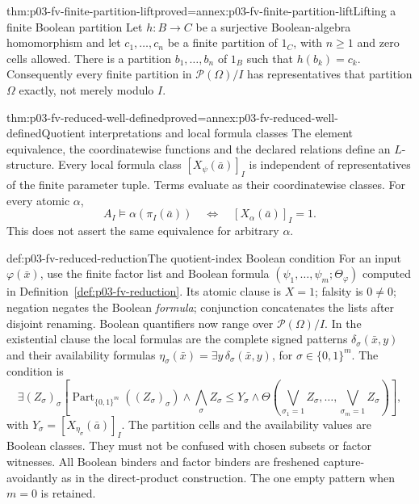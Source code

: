 \begin{hblemma}{thm:p03-fv-finite-partition-lift}{proved=annex:p03-fv-finite-partition-lift}{Lifting a finite Boolean partition}
Let \(h:B\to C\) be a surjective Boolean-algebra homomorphism and
let \(c_1,\ldots,c_n\) be a finite partition of \(1_C\), with
\(n\ge1\) and zero cells allowed. There is a partition
\(b_1,\ldots,b_n\) of \(1_B\) such that \(h(b_k)=c_k\).
Consequently every finite partition in \(\mathcal P(\Omega)/I\)
has representatives that partition \(\Omega\) exactly, not merely
modulo \(I\).
\end{hblemma}

\begin{hblemma}{thm:p03-fv-reduced-well-defined}{proved=annex:p03-fv-reduced-well-defined}{Quotient interpretations and local formula classes}
The element equivalence, the coordinatewise functions and the declared
relations define an \(L\)-structure. Every local formula class
\([X_\psi(\bar a)]_I\) is independent of representatives of the
finite parameter tuple. Terms evaluate as their coordinatewise classes.
For every atomic \(\alpha\),
\[
 A_I\models\alpha(\pi_I(\bar a))
 \quad\Longleftrightarrow\quad
 [X_\alpha(\bar a)]_I=1.
\]
This does not assert the same equivalence for arbitrary \(\alpha\).
\end{hblemma}

\begin{hbdefinition}{def:p03-fv-reduced-reduction}{The quotient-index Boolean condition}
For an input \(\varphi(\bar x)\), use the finite factor list and
Boolean formula \((\psi_1,\ldots,\psi_m;\Theta_\varphi)\) computed
in Definition~\ref{def:p03-fv-reduction}. Its atomic clause is \(X=1\);
falsity is \(0\ne0\); negation negates the Boolean \emph{formula};
conjunction concatenates the lists after disjoint renaming. Boolean
quantifiers now range over \(\mathcal P(\Omega)/I\).
In the existential clause the local formulas are the complete signed
patterns \(\delta_\sigma(\bar x,y)\) and their availability formulas
\(\eta_\sigma(\bar x)=\exists y\,\delta_\sigma(\bar x,y)\),
for \(\sigma\in\{0,1\}^m\). The condition is
\[
 \exists(Z_\sigma)_\sigma\left[
 \operatorname{Part}_{\{0,1\}^m}((Z_\sigma)_\sigma)
 \land\bigwedge_\sigma Z_\sigma\le Y_\sigma
 \land\Theta\left(\bigvee_{\sigma_1=1}Z_\sigma,\ldots,
                         \bigvee_{\sigma_m=1}Z_\sigma\right)\right],
\]
with \(Y_\sigma=[X_{\eta_\sigma}(\bar a)]_I\).
The partition cells and the availability values are Boolean classes.
They must not be confused with chosen subsets or factor witnesses.
All Boolean binders and factor binders are freshened capture-avoidantly
as in the direct-product construction. The one empty pattern when
\(m=0\) is retained.
\end{hbdefinition}

